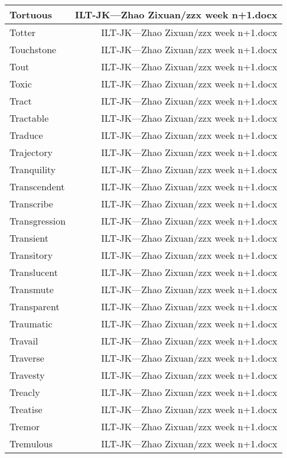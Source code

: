 \documentclass{article}
\begin{document}
\begin{center}
\begin{longtable}{|l|r|}
\hline
Tortuous  &  ILT-JK---Zhao Zixuan/zzx week n+1.docx\\  
\hline
Totter  &  ILT-JK---Zhao Zixuan/zzx week n+1.docx\\  
\hline
Touchstone  &  ILT-JK---Zhao Zixuan/zzx week n+1.docx\\  
\hline
Tout  &  ILT-JK---Zhao Zixuan/zzx week n+1.docx\\  
\hline
Toxic  &  ILT-JK---Zhao Zixuan/zzx week n+1.docx\\  
\hline
Tract  &  ILT-JK---Zhao Zixuan/zzx week n+1.docx\\  
\hline
Tractable  &  ILT-JK---Zhao Zixuan/zzx week n+1.docx\\  
\hline
Traduce  &  ILT-JK---Zhao Zixuan/zzx week n+1.docx\\  
\hline
Trajectory  &  ILT-JK---Zhao Zixuan/zzx week n+1.docx\\  
\hline
Tranquility  &  ILT-JK---Zhao Zixuan/zzx week n+1.docx\\  
\hline
Transcendent  &  ILT-JK---Zhao Zixuan/zzx week n+1.docx\\  
\hline
Transcribe  &  ILT-JK---Zhao Zixuan/zzx week n+1.docx\\  
\hline
Transgression  &  ILT-JK---Zhao Zixuan/zzx week n+1.docx\\  
\hline
Transient  &  ILT-JK---Zhao Zixuan/zzx week n+1.docx\\  
\hline
Transitory  &  ILT-JK---Zhao Zixuan/zzx week n+1.docx\\  
\hline
Translucent  &  ILT-JK---Zhao Zixuan/zzx week n+1.docx\\  
\hline
Transmute  &  ILT-JK---Zhao Zixuan/zzx week n+1.docx\\  
\hline
Transparent  &  ILT-JK---Zhao Zixuan/zzx week n+1.docx\\  
\hline
Traumatic  &  ILT-JK---Zhao Zixuan/zzx week n+1.docx\\  
\hline
Travail  &  ILT-JK---Zhao Zixuan/zzx week n+1.docx\\  
\hline
Traverse  &  ILT-JK---Zhao Zixuan/zzx week n+1.docx\\  
\hline
Travesty  &  ILT-JK---Zhao Zixuan/zzx week n+1.docx\\  
\hline
Treacly  &  ILT-JK---Zhao Zixuan/zzx week n+1.docx\\  
\hline
Treatise  &  ILT-JK---Zhao Zixuan/zzx week n+1.docx\\  
\hline
Tremor  &  ILT-JK---Zhao Zixuan/zzx week n+1.docx\\  
\hline
Tremulous  &  ILT-JK---Zhao Zixuan/zzx week n+1.docx\\  

\end{longtable}
\end{center}
\end{document}
